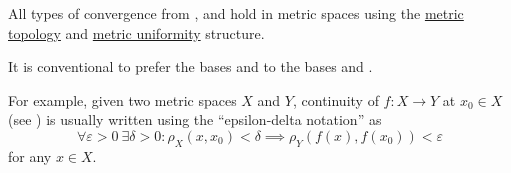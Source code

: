 \begin{Remark}\label{remark:metric_space_convergence}
  All types of convergence from ,  and  hold in metric spaces using the \hyperref[def:metric_topology]{metric topology} and \hyperref[def:metric_uniformity]{metric uniformity} structure.

  It is conventional to prefer the bases  and  to the bases  and .

  For example, given two metric spaces \( X \) and \( Y \), continuity of \( f: X \to Y \) at \( x_0 \in X \) (see ) is usually written using the \enquote{epsilon-delta notation} as
  \begin{equation*}
    \forall \varepsilon > 0 \ \exists \delta > 0 : \rho_X(x, x_0) < \delta \implies \rho_Y(f(x), f(x_0)) < \varepsilon
  \end{equation*}
  for any \( x \in X \).
\end{Remark}
